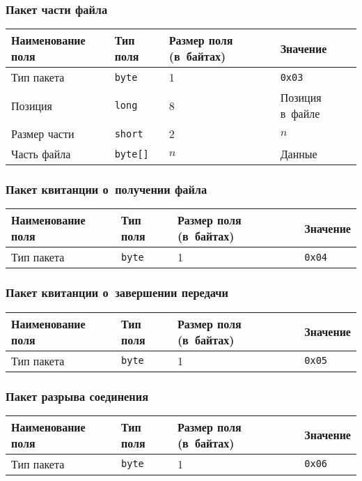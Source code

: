 \documentclass[a4paper,12pt]{article}
\begin{document}
\subsubsection{Пакет части файла}
\begin{center}
\begin{tabular}{|l|l|l|l|}
\hline
Наименование поля	&	Тип поля	&	Размер поля (в~байтах)	&	Значение\\\hline
Тип пакета	&	\texttt{byte}	&	1	&	\texttt{0x03}\\\hline
Позиция	&	\texttt{long}	&	8	&	Позиция в~файле\\\hline
Размер части	&	\texttt{short}	&	2	&	$n$\\\hline
Часть файла	&	\texttt{byte[]}	&	$n$	&	Данные\\\hline
\end{tabular}
\end{center}

\subsubsection{Пакет квитанции о~получении файла}
\begin{center}
\begin{tabular}{|l|l|l|l|}
\hline
Наименование поля	&	Тип поля	&	Размер поля (в~байтах)	&	Значение\\\hline
Тип пакета	&	\texttt{byte}	&	1	&	\texttt{0x04}\\\hline
\end{tabular}
\end{center}

\subsubsection{Пакет квитанции о~завершении передачи}
\begin{center}
\begin{tabular}{|l|l|l|l|}
\hline
Наименование поля	&	Тип поля	&	Размер поля (в~байтах)	&	Значение\\\hline
Тип пакета	&	\texttt{byte}	&	1	&	\texttt{0x05}\\\hline
\end{tabular}
\end{center}

\subsubsection{Пакет разрыва соединения}
\begin{center}
\begin{tabular}{|l|l|l|l|}
\hline
Наименование поля	&	Тип поля	&	Размер поля (в~байтах)	&	Значение\\\hline
Тип пакета	&	\texttt{byte}	&	1	&	\texttt{0x06}\\\hline
\end{tabular}
\end{center}
\end{document}
